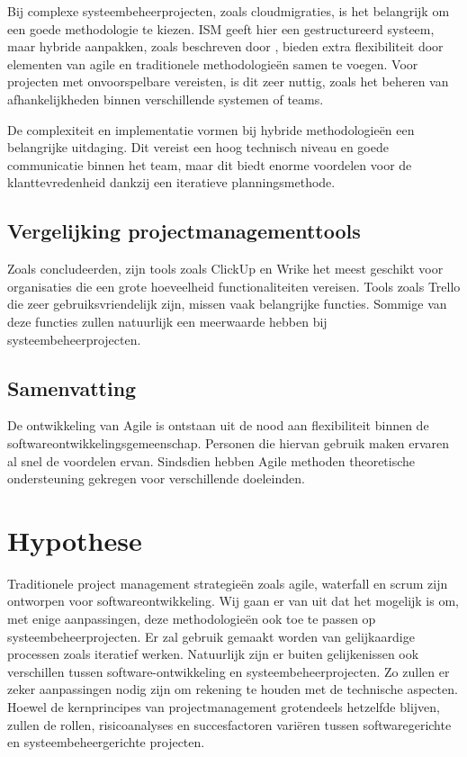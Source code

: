 \documentclass{article}
\begin{document}
    Bij complexe systeembeheerprojecten, zoals cloudmigraties, is het belangrijk om een goede methodologie te kiezen. 
    ISM geeft hier een gestructureerd systeem, maar hybride aanpakken, zoals beschreven door \textcite{reiff2022hybrid}, 
    bieden extra flexibiliteit door elementen van agile en traditionele methodologieën samen te voegen.
    Voor projecten met onvoorspelbare vereisten, is dit zeer nuttig, zoals het beheren van afhankelijkheden binnen verschillende systemen of teams. \autocite{reiff2022hybrid}

    De complexiteit en implementatie vormen bij hybride methodologieën een belangrijke uitdaging.
    Dit vereist een hoog technisch niveau en goede communicatie binnen het team, maar dit biedt enorme voordelen voor de klanttevredenheid dankzij een iteratieve planningsmethode. \autocite{reiff2022hybrid}

    \subsection{Vergelijking projectmanagementtools}

    Zoals \textcite{pasaric2022comparison} concludeerden, zijn tools zoals ClickUp en Wrike het meest geschikt voor organisaties die een grote hoeveelheid functionaliteiten vereisen. 
    Tools zoals Trello die zeer gebruiksvriendelijk zijn, missen vaak belangrijke functies. 
    Sommige van deze functies zullen natuurlijk een meerwaarde hebben bij systeembeheerprojecten. \autocite{pasaric2022comparison}

    \subsection{Samenvatting}
    De ontwikkeling van Agile is ontstaan uit de nood aan flexibiliteit binnen de softwareontwikkelingsgemeenschap. 
    Personen die hiervan gebruik maken ervaren al snel de voordelen ervan.
    Sindsdien hebben Agile methoden theoretische ondersteuning gekregen voor verschillende doeleinden. \autocite{STRAY2022107058}

    \section{Hypothese}

    Traditionele project management strategieën zoals agile, waterfall en scrum zijn ontworpen voor softwareontwikkeling. 
    Wij gaan er van uit dat het mogelijk is om, met enige aanpassingen, deze methodologieën ook toe te passen op systeembeheerprojecten.
    Er zal gebruik gemaakt worden van gelijkaardige processen zoals iteratief werken.\newline
    Natuurlijk zijn er buiten gelijkenissen ook verschillen tussen software-ontwikkeling en systeembeheerprojecten. 
    Zo zullen er zeker aanpassingen nodig zijn om rekening te houden met de technische aspecten.
    Hoewel de kernprincipes van projectmanagement grotendeels hetzelfde blijven, zullen de rollen, risicoanalyses en 
    succesfactoren variëren tussen softwaregerichte en systeembeheergerichte projecten.
\end{document}
